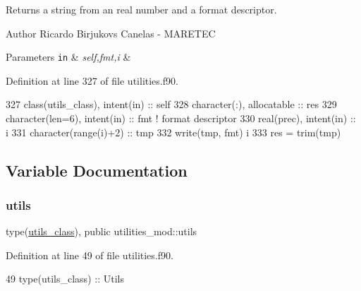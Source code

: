 Returns a string from an real number and a format descriptor. 

\begin{DoxyAuthor}{Author}
Ricardo Birjukovs Canelas -\/ M\+A\+R\+E\+T\+EC 
\end{DoxyAuthor}

\begin{DoxyParams}[1]{Parameters}
\mbox{\tt in}  & {\em self,fmt,i} & \\
\hline
\end{DoxyParams}


Definition at line 327 of file utilities.\+f90.


\begin{DoxyCode}
327     \textcolor{keywordtype}{class}(utils\_class), \textcolor{keywordtype}{intent(in)} :: self
328     \textcolor{keywordtype}{character(:)}, \textcolor{keywordtype}{allocatable} :: res
329     \textcolor{keywordtype}{character(len=6)}, \textcolor{keywordtype}{intent(in)} :: fmt \textcolor{comment}{! format descriptor}
330     \textcolor{keywordtype}{real(prec)}, \textcolor{keywordtype}{intent(in)} :: i
331     \textcolor{keywordtype}{character(range(i)+2)} :: tmp
332     \textcolor{keyword}{write}(tmp, fmt) i
333     res = trim(tmp)
\end{DoxyCode}


\subsection{Variable Documentation}
\mbox{\label{namespaceutilities__mod_aa12c2506b3107528a2511d059186f12d}} 
\subsubsection{\texorpdfstring{utils}{utils}}
{\footnotesize\ttfamily type(\mbox{\hyperlink{structutilities__mod_1_1utils__class}{utils\+\_\+class}}), public utilities\+\_\+mod\+::utils}



Definition at line 49 of file utilities.\+f90.


\begin{DoxyCode}
49     \textcolor{keywordtype}{type}(utils\_class) :: Utils
\end{DoxyCode}
